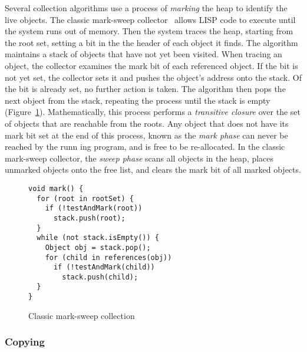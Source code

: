 Several collection algorithms use a process of \emph{marking} the heap to identify the live
objects.  The classic mark-sweep collector~\citep{McCarthy:60} allows LISP code to execute until
the system runs out of memory.  Then the system traces the heap, starting from the root set,
setting a bit in the the header of each object it finds.  The algorithm maintains a stack of
objects that have not yet been visited.  When tracing an object, the collector examines the mark 
bit of each referenced object.  If the bit is not yet set, the collector sets it and pushes the 
object's address onto the stack.  Of the bit is already set, no further action is taken. 
The algorithm then pops the next object from the stack, repeating the process until the stack
is empty (Figure~\ref{fig:intro:mark}).
Mathematically, this process performs a \emph{transitive closure} over the set of objects that
are reachable from the roots.  Any object that does not have its mark bit set at the end of this
process, known as the \emph{mark phase} can never be reached by the runn ing program, and is
free to be re-allocated.  In the classic mark-sweep collector, the \emph{sweep phase} scans all
objects in the heap, places unmarked objects onto the free list, and clears the mark bit of all 
marked objects.

\begin{figure}[h!t]
\begin{lstlisting}
void mark() {
  for (root in rootSet) {
    if (!testAndMark(root)) 
      stack.push(root);
  }
  while (not stack.isEmpty()) {
    Object obj = stack.pop();
    for (child in references(obj))
      if (!testAndMark(child)) 
        stack.push(child);
  }
}
\end{lstlisting}
\caption{Classic mark-sweep collection}
\label{fig:intro:mark}
\end{figure}

\subsubsection{Copying}

